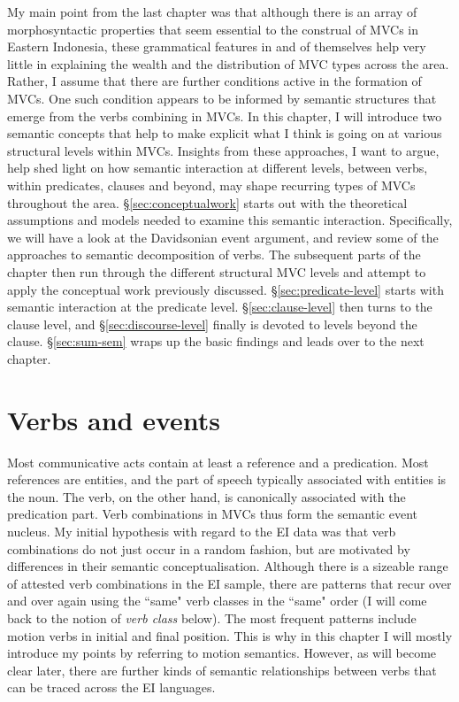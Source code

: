 My main point from the last chapter was that although there is an array of morphosyntactic properties that seem essential to the construal of MVCs in Eastern Indonesia, these grammatical features in and of themselves help very little in explaining the wealth and the distribution of MVC types across the area. Rather, I assume that there are further conditions active in the formation of MVCs. One such condition appears to be informed by semantic structures that emerge from the verbs combining in MVCs. In this chapter, I will introduce two semantic concepts that help to make explicit what I think is going on at various structural levels within MVCs. Insights from these approaches, I want to argue, help shed light on how semantic interaction at different levels, between verbs, within predicates, clauses and beyond, may shape recurring types of MVCs throughout the area. §\ref{sec:conceptualwork} starts out with the theoretical assumptions and models needed to examine this semantic interaction. Specifically, we will have a look at the Davidsonian event argument, and review some of the approaches to semantic decomposition of verbs. The subsequent parts of the chapter then run through the different structural MVC levels and attempt to apply the conceptual work previously discussed. §\ref{sec:predicate-level} starts with semantic interaction at the predicate level. §\ref{sec:clause-level} then turns to the clause level, and §\ref{sec:discourse-level} finally is devoted to levels beyond the clause. §\ref{sec:sum-sem} wraps up the basic findings and leads over to the next chapter.

\section{Verbs and events}
\label{sec:verbsevents}

Most communicative acts contain at least a reference and a predication. Most references are entities, and the part of speech typically associated with entities is the noun. The verb, on the other hand, is canonically associated with the predication part. Verb combinations in MVCs thus form the semantic event nucleus. My initial hypothesis with regard to the EI data was that verb combinations do not just occur in a random fashion, but are motivated by differences in their semantic conceptualisation. Although there is a sizeable range of attested verb combinations in the EI sample, there are patterns that recur over and over again using the ``same" verb classes in the ``same" order (I will come back to the notion of \textit{verb class} below). The most frequent patterns include motion verbs in initial and final position. This is why in this chapter I will mostly introduce my points by referring to motion semantics. However, as will become clear later, there are further kinds of semantic relationships between verbs that can be traced across the EI languages. 

